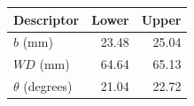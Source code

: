 \begin{tabular}{lrr}\toprule
Descriptor & Lower & Upper\\\midrule
$b$ (mm) & 23.48 & 25.04 \\
$WD$ (mm) & 64.64 & 65.13 \\
$\theta$ (degrees) & 21.04 & 22.72 \\
\bottomrule
\end{tabular}

